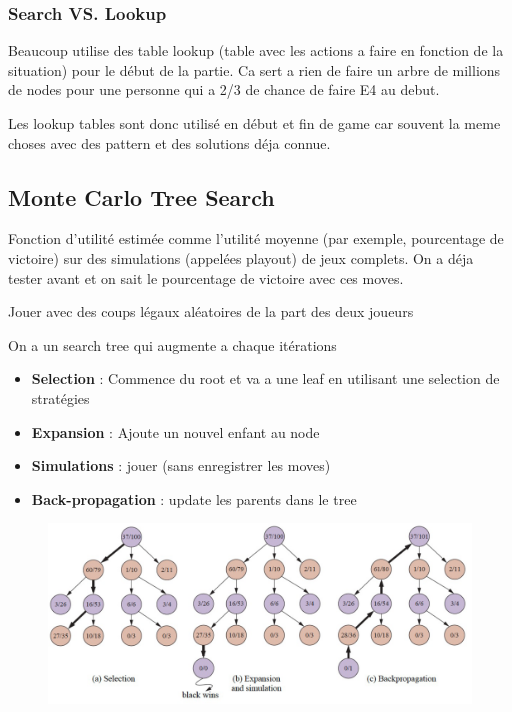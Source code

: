 		\subsubsection{Search VS. Lookup}
			Beaucoup utilise des table lookup (table avec les actions a faire en fonction de la situation) pour le début de la partie. Ca sert a rien de faire un arbre de millions de nodes pour une personne qui a 2/3 de chance de faire E4 au debut. 
		
		Les lookup tables sont donc utilisé en début et fin de game car souvent la meme choses avec des pattern et des solutions déja connue.
			
	\subsection{Monte Carlo Tree Search}
			
		Fonction d'utilité estimée comme l'utilité moyenne (par exemple, pourcentage de victoire) sur des simulations (appelées playout) de jeux complets. On a déja tester avant et on sait le pourcentage de victoire avec ces moves.
		
		Jouer avec des coups légaux aléatoires de la part des deux joueurs
		
		On a un search tree qui augmente a chaque itérations
		\begin{itemize}
			\item \textbf{Selection} : Commence du root et va a une leaf en utilisant une selection de stratégies
			\item \textbf{Expansion} : Ajoute un nouvel enfant au node
			\item \textbf{Simulations} : jouer (sans enregistrer les moves)
			\item \textbf{Back-propagation} : update les parents dans le tree
		\end{itemize}
		
		\begin{figure}[H]
			\centering
			\includegraphics[width=\textwidth]{img/MCTS.png}
		\end{figure}
		
